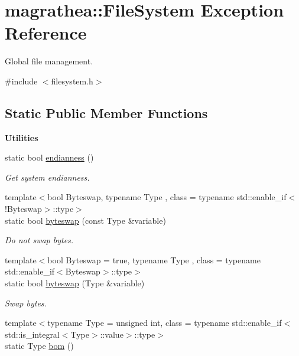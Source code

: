 \hypertarget{exceptionmagrathea_1_1FileSystem}{\section{magrathea\-:\-:File\-System Exception Reference}
\label{exceptionmagrathea_1_1FileSystem}
}


Global file management.  




{\ttfamily \#include $<$filesystem.\-h$>$}

\subsection*{Static Public Member Functions}
\begin{Indent}{\bf Utilities}\par
\begin{DoxyCompactItemize}
\item 
static bool \hyperlink{exceptionmagrathea_1_1FileSystem_ac5ee917157fa4b42e78d30c0da0bf133}{endianness} ()
\begin{DoxyCompactList}\small\item\em Get system endianness. \end{DoxyCompactList}\item 
{\footnotesize template$<$bool Byteswap, typename Type , class  = typename std\-::enable\-\_\-if$<$!\-Byteswap$>$\-::type$>$ }\\static bool \hyperlink{exceptionmagrathea_1_1FileSystem_a1d989cd366395e5ef84131f79134d7de}{byteswap} (const Type \&variable)
\begin{DoxyCompactList}\small\item\em Do not swap bytes. \end{DoxyCompactList}\item 
{\footnotesize template$<$bool Byteswap = true, typename Type , class  = typename std\-::enable\-\_\-if$<$\-Byteswap$>$\-::type$>$ }\\static bool \hyperlink{exceptionmagrathea_1_1FileSystem_a64859ee869800ddcdc7c224a93703c59}{byteswap} (Type \&variable)
\begin{DoxyCompactList}\small\item\em Swap bytes. \end{DoxyCompactList}\item 
{\footnotesize template$<$typename Type  = unsigned int, class  = typename std\-::enable\-\_\-if$<$std\-::is\-\_\-integral$<$\-Type$>$\-::value$>$\-::type$>$ }\\static Type \hyperlink{exceptionmagrathea_1_1FileSystem_ad5eac053ec39dbb33200d5f3e3915484}{bom} ()

\end{DoxyCompactItemize}
\end{Indent}
